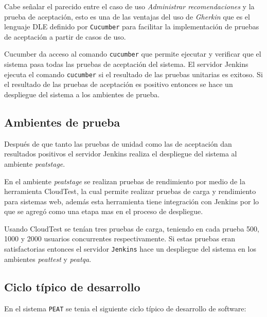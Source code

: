 Cabe señalar el parecido entre el caso de uso \textit{Administrar recomendaciones}
y la prueba de aceptación, esto es una de las ventajas del uso de \textit{Gherkin}
que es el lenguaje DLE definido por \texttt{Cucumber} para facilitar la
implementación de pruebas de aceptación a partir de casos de uso.

Cucumber da acceso al comando \texttt{cucumber} que permite ejecutar y verificar
que el sistema pasa todas las pruebas de aceptación del sistema. El servidor
Jenkins ejecuta el comando \texttt{cucumber} si el resultado de las pruebas
unitarias es exitoso. Si el resultado de las pruebas de aceptación es positivo
entonces se hace un despliegue del sistema a los ambientes de prueba.

\subsection{Ambientes de prueba}

Después de que tanto las pruebas de unidad como las de aceptación dan resultados
positivos el servidor Jenkins realiza el despliegue del sistema al ambiente
\textit{peatstage}.

En el ambiente \textit{peatstage} se realizan pruebas de rendimiento por medio
de la herramienta CloudTest, la cual permite realizar pruebas de carga y
rendimiento para sistemas web, además esta herramienta tiene integración con
Jenkins por lo que se agregó como una etapa mas en el proceso de despliegue.

Usando CloudTest se tenían tres pruebas de carga, teniendo en cada prueba 500, 1000
y 2000 usuarios concurrentes respectivamente. Si estas pruebas eran satisfactorias
entonces el servidor \texttt{Jenkins} hace un despliegue del sistema en los
ambientes \textit{peattest} y \textit{peatqa}.

\subsection{Ciclo típico de desarrollo}

En el sistema \texttt{PEAT} se tenia el siguiente ciclo típico de desarrollo de
software:

